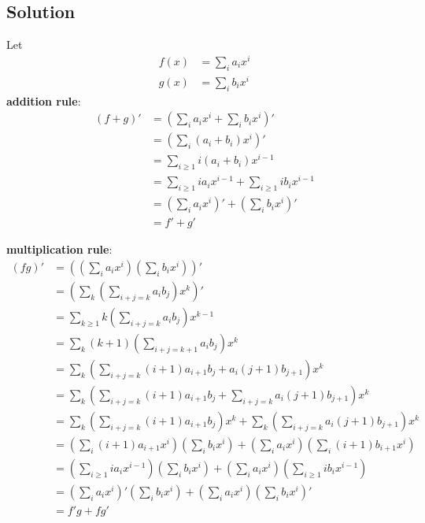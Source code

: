 \documentclass[fleqn]{article}
\begin{document}
        \subsection{Solution}
        Let
        \begin{align}
            f(x) &= \sum\limits_i a_i x^i \\
            g(x) &= \sum\limits_i b_i x^i
        \end{align}
        \textbf{addition rule}:
        \begin{align}
            (f + g)' &= \left(\sum\limits_i a_i x^i + \sum\limits_i b_i x^i\right)' \\
                &= \left(\sum\limits_i (a_i + b_i) x^i\right)' \\
                &= \sum\limits_{i \geq 1} i(a_i + b_i) x^{i - 1} \\
                &= \sum\limits_{i \geq 1} ia_i x^{i - 1} + \sum\limits_{i \geq 1} ib_i x^{i - 1} \\
                &= \left(\sum\limits_i a_i x^i\right)' + \left(\sum\limits_i b_i x^i\right)' \\
                &= f' + g'
        \end{align}
        
        \textbf{multiplication rule}:
        \begin{align}
            (fg)' &= \left(\left(\sum\limits_i a_i x^i\right) \left(\sum\limits_i b_i x^i\right)\right)' \\
                &= \left(\sum\limits_k \left(\sum\limits_{i + j = k} a_i b_j\right) x^k\right)' \\
                &= \sum\limits_{k \geq 1} k \left(\sum\limits_{i + j = k} a_i b_j\right) x^{k - 1} \\
                &= \sum\limits_k (k + 1) \left(\sum\limits_{i + j = k + 1} a_i b_j\right) x^k \\
                &= \sum\limits_k \left(\sum\limits_{i + j = k} (i + 1) a_{i + 1} b_j + a_i (j + 1) b_{j + 1}\right) x^k \\
                &= \sum\limits_k \left(\sum\limits_{i + j = k} (i + 1) a_{i + 1} b_j + \sum\limits_{i + j = k} a_i (j + 1) b_{j + 1}\right) x^k \\
                &= \sum\limits_k \left(\sum\limits_{i + j = k} (i + 1) a_{i + 1} b_j\right) x^k + \sum\limits_k \left(\sum\limits_{i + j = k} a_i (j + 1) b_{j + 1}\right) x^k \\
                &= \left(\sum\limits_i (i + 1) a_{i + 1} x^i\right) \left(\sum\limits_i b_i x^i\right) + \left(\sum\limits_i a_i x^i\right) \left(\sum\limits_i (i + 1) b_{i + 1} x^i\right) \\
                &= \left(\sum\limits_{i \geq 1} i a_i x^{i - 1}\right) \left(\sum\limits_i b_i x^i\right) + \left(\sum\limits_i a_i x^i\right) \left(\sum\limits_{i \geq 1} i b_i x^{i - 1}\right) \\
                &= \left(\sum\limits_i a_i x^i\right)' \left(\sum\limits_i b_i x^i\right) + \left(\sum\limits_i a_i x^i\right) \left(\sum\limits_i b_i x^i\right)' \\
                &= f'g + fg'
        \end{align}
    
\end{document}
